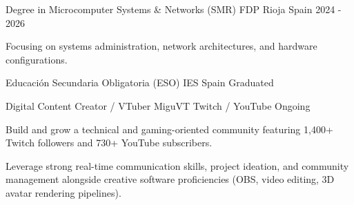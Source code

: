 \documentclass[11pt, a4paper]{awesome-cv}
\begin{document}
\begin{cventries}

  \cventry
    {Degree in Microcomputer Systems \& Networks (SMR)} %
    {FDP Rioja} %
    {Spain} %
    {2024 - 2026} %
    {
      \begin{cvitems} %
        \item {Focusing on systems administration, network architectures, and hardware configurations.}
      \end{cvitems}
    }

  \cventry
    {Educación Secundaria Obligatoria (ESO)} %
    {IES} %
    {Spain} %
    {Graduated} %
    {}

\end{cventries}


\begin{cventries}
  \cventry
    {Digital Content Creator / VTuber}
    {MiguVT}
    {Twitch / YouTube}
    {Ongoing}
    {
      \begin{cvitems}
        \item {Build and grow a technical and gaming-oriented community featuring 1,400+ Twitch followers and 730+ YouTube subscribers.}
        \item {Leverage strong real-time communication skills, project ideation, and community management alongside creative software proficiencies (OBS, video editing, 3D avatar rendering pipelines).}
      \end{cvitems}
    }
\end{cventries}
\end{document}
